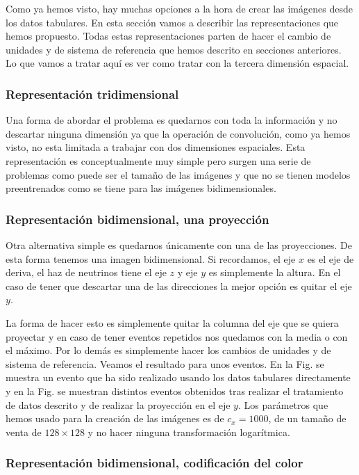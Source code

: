 \documentclass[a4paper,12pt,twoside,titlepage]{article}
\begin{document}
Como ya hemos visto, hay muchas opciones a la hora de crear las imágenes desde los datos tabulares. En esta sección vamos a describir las representaciones que hemos propuesto. Todas estas representaciones parten de hacer el cambio de unidades y de sistema de referencia que hemos descrito en secciones anteriores. Lo que vamos a tratar aquí es ver como tratar con la tercera dimensión espacial. 

\subsubsection*{Representación tridimensional}

Una forma de abordar el problema es quedarnos con toda la información y no descartar ninguna dimensión ya que la operación de convolución, como ya hemos visto, no esta limitada a trabajar con dos dimensiones espaciales. Esta representación es conceptualmente muy simple pero surgen una serie de problemas como puede ser el tamaño de las imágenes y que no se tienen modelos preentrenados como se tiene para las imágenes bidimensionales.

\subsubsection*{Representación bidimensional, una proyección}

Otra alternativa simple es quedarnos únicamente con una de las proyecciones. De esta forma tenemos una imagen bidimensional. Si recordamos, el eje $x$ es el eje de deriva, el haz de neutrinos tiene el eje $z$ y eje $y$ es simplemente la altura. En el caso de tener que descartar una de las direcciones la mejor opción es quitar el eje $y$.

La forma de hacer esto es simplemente quitar la columna del eje que se quiera proyectar y en caso de tener eventos repetidos nos quedamos con la media o con el máximo. Por lo demás es simplemente hacer los cambios de unidades y de sistema de referencia. Veamos el resultado para unos eventos. En la Fig. se muestra un evento que ha sido realizado usando los datos tabulares directamente y en la Fig. se muestran distintos eventos obtenidos tras realizar el tratamiento de datos descrito y de realizar la proyección en el eje $y$. Los parámetros que hemos usado para la creación de las imágenes es de $c_x = 1000$, de un tamaño de venta de $128\times 128$ y no hacer ninguna transformación logarítmica. 

\subsubsection*{Representación bidimensional, codificación del color}
\end{document}
